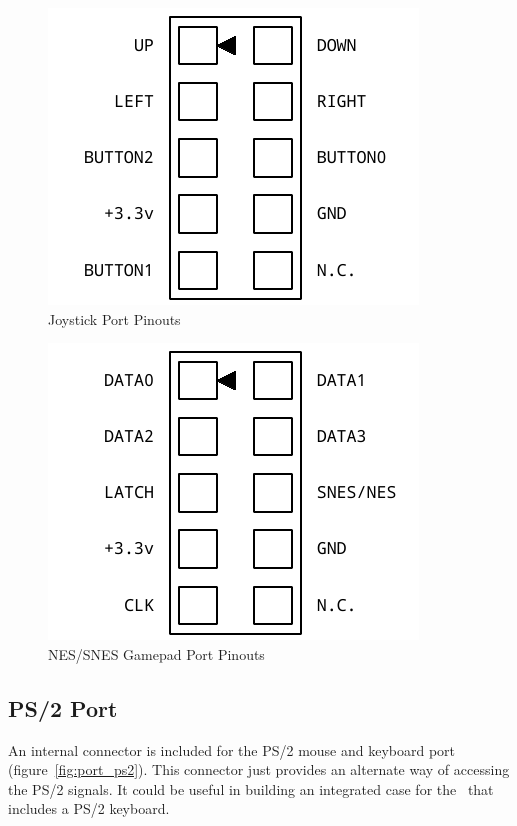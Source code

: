 \begin{figure}[ht]
    \begin{center}
        \includegraphics[scale=0.65]{images/f256_port_joystick.pdf}
    \end{center}
    \caption{Joystick Port Pinouts}
    \label{fig:port_joy}
\end{figure}

\begin{figure}[ht]
    \begin{center}
        \includegraphics[scale=0.65]{images/f256_port_nes.pdf}
    \end{center}
    \caption{NES/SNES Gamepad Port Pinouts}
    \label{fig:port_nes}
\end{figure}

\subsection*{PS/2 Port}

An internal connector is included for the PS/2 mouse and keyboard port (figure~\ref{fig:port_ps2}). This connector just provides an alternate way of accessing the PS/2 signals. It could be useful in building an integrated case for the \fjr\ that includes a PS/2 keyboard.

